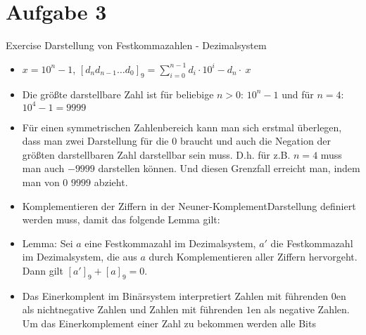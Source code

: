 
\section{Aufgabe 3}

\setcounter{exercise}{1}

\begin{frame}[allowframebreaks]{Exercise \thesection}{Darstellung von Festkommazahlen - Dezimalsystem}
  \begin{solution}
    \begin{itemize}
      \item $x=10^n-1$, $\displaystyle [d_{n}d_{n-1}\ldots d_{0}]_9=\sum_{i=0}^{n-1}d_{i}\cdot 10^{i}-d_{n}\cdot\ x$
      \item Die \alert{größte darstellbare Zahl} ist für beliebige $n>0$: $10^n - 1$ und für $n=4$: $10^4-1 = 9999$
      \item Für einen symmetrischen Zahlenbereich kann man sich erstmal überlegen, dass man zwei Darstellung für die $0$ braucht und auch die Negation der größten darstellbaren Zahl darstellbar sein muss. D.h. für z.B. $n = 4$ muss man auch $-9999$ darstellen können. Und diesen Grenzfall erreicht man, indem man von $0$ $9999$ abzieht.
    \end{itemize}
  \end{solution}
  \begin{exercisenoinc}
    \begin{itemize}
      \item \alert{Komplementieren} der Ziffern in der \alert{Neuner-KomplementDarstellung} definiert werden muss, damit das folgende Lemma gilt:
      \item \alert{Lemma:} Sei $a$ eine Festkommazahl im Dezimalsystem, $a'$ die Festkommazahl im Dezimalsystem, die aus $a$ durch Komplementieren aller Ziffern hervorgeht. Dann gilt $[a']_9 + [a]_9 = 0$.
    \end{itemize}
  \end{exercisenoinc}
  \begin{solutionnoinc}
    \begin{itemize}
      \item Das Einerkomplent im Binärsystem interpretiert Zahlen mit führenden $0$en als nichtnegative Zahlen und Zahlen
mit führenden $1$en als negative Zahlen. Um das Einerkomplement einer Zahl zu bekommen werden alle Bits

\end{itemize}
\end{solutionnoinc}
\end{frame}
